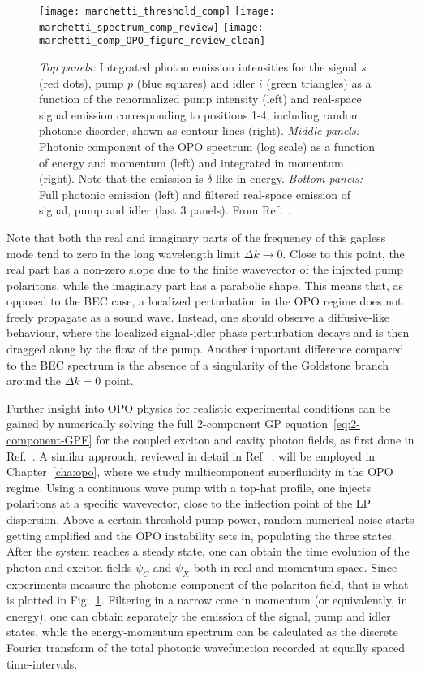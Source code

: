 \begin{figure}[p] %
  \centering
    \texttt{[image: marchetti\_threshold\_comp]}
    \texttt{[image: marchetti\_spectrum\_comp\_review]}
    \texttt{[image: marchetti\_comp\_OPO\_figure\_review\_clean]}
  \caption{
    \emph{Top panels:} Integrated photon emission intensities for the
    signal $s$ (red dots), pump $p$ (blue squares) and idler $i$ (green
    triangles) as a function of the renormalized pump intensity (left) and
    real-space signal emission corresponding to positions 1-4, including
    random photonic disorder, shown as contour lines (right).
    \emph{Middle panels:} Photonic component of the OPO spectrum (log
    scale) as a function of energy and momentum (left) and integrated in
    momentum (right). Note that the emission is $\delta$-like in energy.
    \emph{Bottom panels:} Full photonic emission (left) and filtered
    real-space emission of signal, pump and idler (last 3 panels). From
    Ref.~\cite{9783642241857}.
  }\label{fig:marchetti}
\end{figure}
%
Note that both the real and imaginary parts of the frequency of this
gapless mode tend to zero in the long wavelength limit
$\Delta k \rightarrow 0$. Close to this point, the real part has a
non-zero slope due to the finite wavevector of the injected pump
polaritons, while the imaginary part has a parabolic shape. This means
that, as opposed to the BEC case, a localized perturbation in the OPO
regime does not freely propagate as a sound wave. Instead, one should
observe a diffusive-like behaviour, where the localized signal-idler
phase perturbation decays and is then dragged along by the flow of the
pump. Another important difference compared to the BEC spectrum is the
absence of a singularity of the Goldstone branch around the
$\Delta k = 0$ point.

Further insight into OPO physics for realistic experimental conditions
can be gained by numerically solving the full 2-component GP
equation~\eqref{eq:2-component-GPE} for the coupled exciton and cavity
photon fields, as first done in Ref.~\cite{Whittaker_2005_c}.  A
similar approach, reviewed in detail in Ref.~\cite{9783642241857},
will be employed in Chapter~\ref{cha:opo}, where we study
multicomponent superfluidity in the OPO regime.
Using a continuous wave pump with a top-hat profile, one injects
polaritons at a specific wavevector, close to the inflection point of
the LP dispersion. Above a certain threshold pump power, random
numerical noise starts getting amplified and the OPO instability sets
in, populating the three states. After the system reaches a steady
state, one can obtain the time evolution of the photon and exciton
fields $\psi_C$ and $\psi_X$ both in real and momentum space. Since
experiments measure the photonic component of the polariton field,
that is what is plotted in Fig.~\ref{fig:marchetti}. Filtering in a
narrow cone in momentum (or equivalently, in energy), one can obtain
separately the emission of the signal, pump and idler states, while
the energy-momentum spectrum can be calculated as the discrete Fourier
transform of the total photonic wavefunction recorded at equally
spaced time-intervals.

